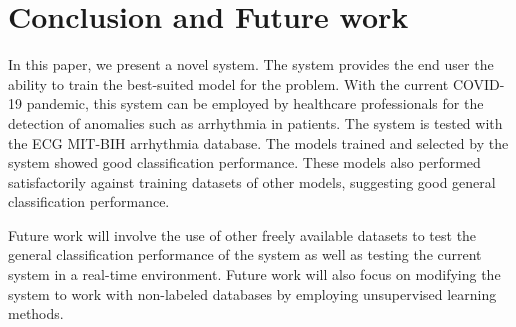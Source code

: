 \clearpage
\section{Conclusion and Future work} \label{sec:conclusion_and_future_work}
In this paper, we present a novel system. The system provides the end user the ability to train the best-suited model for the problem. With the current COVID-19 pandemic, this system can be employed by healthcare professionals for the detection of anomalies such as arrhythmia in patients. The system is tested with the ECG MIT-BIH arrhythmia database. {\responsemod The models trained and selected by the system showed good classification performance. These models also performed satisfactorily against training datasets of other models, suggesting good general classification performance.}

Future work will involve the use of other freely available datasets to test the general classification performance of the system as well as testing the current system in a real-time environment. {\responsemod Future work will also focus on modifying the system to work with non-labeled databases by employing unsupervised learning methods.}
